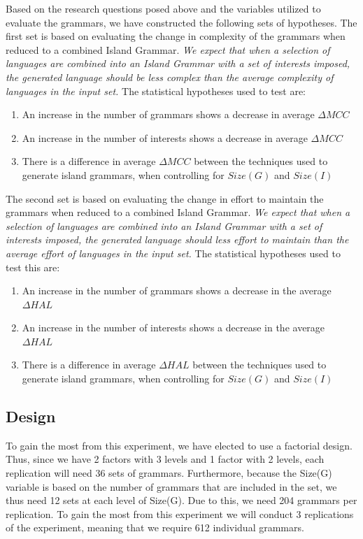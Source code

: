 \documentclass[10pt,nocc]{xrese_report}
\begin{document}
Based on the research questions posed above and the variables utilized to evaluate the grammars, we have constructed the following sets of hypotheses. The first set is based on evaluating the change in complexity of the grammars when reduced to a combined Island Grammar. \textit{We expect that when a selection of languages are combined into an Island Grammar with a set of interests imposed, the generated language should be less complex than the average complexity of languages in the input set.} The statistical hypotheses used to test are:

\begin{enumerate}[left=1em,label=H\textsubscript{\arabic*,0} :]
 \item An increase in the number of grammars shows a decrease in average $\Delta MCC$
 \item An increase in the number of interests shows a decrease in average $\Delta MCC$
 \item There is a difference in average $\Delta MCC$ between the techniques used to generate island grammars, when controlling for $Size(G)$ and $Size(I)$
\end{enumerate}

The second set is based on evaluating the change in effort to maintain the grammars when reduced to a combined Island Grammar. \textit{We expect that when a selection of languages are combined into an Island Grammar with a set of interests imposed, the generated language should less effort to maintain than the average effort of languages in the input set.} The statistical hypotheses used to test this are:

\begin{enumerate}[left=1em,label=H\textsubscript{\arabic*,0} :,start=4]
 \item An increase in the number of grammars shows a decrease in the average $\Delta HAL$
 \item An increase in the number of interests shows a decrease in the average $\Delta HAL$
 \item There is a difference in average $\Delta HAL$ between the techniques used to generate island grammars, when controlling for $Size(G)$ and $Size(I)$
\end{enumerate}

\subsection{Design}

To gain the most from this experiment, we have elected to use a factorial design. Thus, since we have 2 factors with 3 levels and 1 factor with 2 levels, each replication will need 36 sets of grammars. Furthermore, because the Size(G) variable is based on the number of grammars that are included in the set, we thus need 12 sets at each level of Size(G). Due to this, we need 204 grammars per replication. To gain the most from this experiment we will conduct 3 replications of the experiment, meaning that we require 612 individual grammars.
\end{document}
